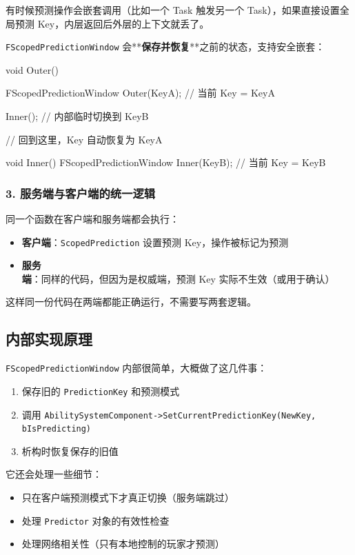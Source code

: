 \documentclass[10pt,CJKmath]{ctexart}
\begin{document}
有时候预测操作会嵌套调用（比如一个 Task 触发另一个 Task），如果直接设置全局预测 Key，内层返回后外层的上下文就丢了。

\texttt{FScopedPredictionWindow} 会**\textbf{保存并恢复}**之前的状态，支持安全嵌套：

\begin{code}
	void Outer()
	{
		FScopedPredictionWindow Outer(KeyA);
		// 当前 Key = KeyA
		
		Inner(); // 内部临时切换到 KeyB
		
		// 回到这里，Key 自动恢复为 KeyA
	}
	
	void Inner()
	{
		FScopedPredictionWindow Inner(KeyB);
		// 当前 Key = KeyB
	}
\end{code}

\subsubsection{3. 服务端与客户端的统一逻辑}

同一个函数在客户端和服务端都会执行：

\begin{itemize}
	\item \textbf{客户端}：\texttt{ScopedPrediction} 设置预测 Key，操作被标记为预测
	\item \textbf{服务端}：同样的代码，但因为是权威端，预测 Key 实际不生效（或用于确认）
\end{itemize}

这样同一份代码在两端都能正确运行，不需要写两套逻辑。

\subsection{内部实现原理}

\texttt{FScopedPredictionWindow} 内部很简单，大概做了这几件事：

\begin{enumerate}
	\item 保存旧的 \texttt{PredictionKey} 和预测模式
	\item 调用 \texttt{AbilitySystemComponent->SetCurrentPredictionKey(NewKey, bIsPredicting)}
	\item 析构时恢复保存的旧值
\end{enumerate}

它还会处理一些细节：

\begin{itemize}
	\item 只在客户端预测模式下才真正切换（服务端跳过）
	\item 处理 \texttt{Predictor} 对象的有效性检查
	\item 处理网络相关性（只有本地控制的玩家才预测）
\end{itemize}
\end{document}
